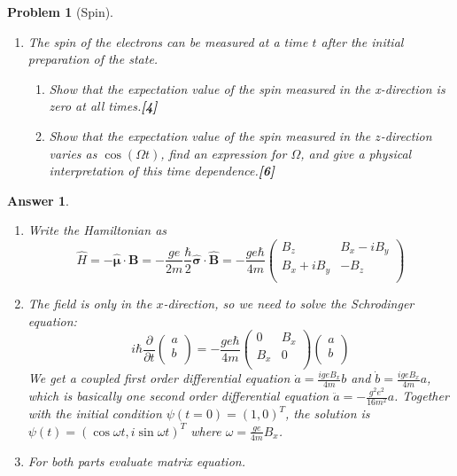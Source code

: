 \documentclass[a4paper]{article}
\newtheorem{ans}{Answer}[subsection]
\theoremstyle{new}
\newtheorem{qns}{Problem}[subsection]
\begin{document}
\begin{qns}[Spin]
\begin{enumerate}[label=(\roman*)]
\item The spin of the electrons can be measured at a time $t$ after the initial preparation of the state.
\begin{enumerate}[label=(\alph*)]
    \item Show that the expectation value of the spin measured in the x-direction is zero at all times.\hfill\textbf{[4]}
    \item  Show that the expectation value of the spin measured in the $z$-direction varies as $\cos(\Omega t)$, find an expression for $\Omega$, and give a physical interpretation of this time dependence.\hfill\textbf{[6]}
\end{enumerate}
\end{enumerate}
\end{qns}
\begin{ans}\leavevmode
\begin{enumerate}[label=(\roman*)]
\item Write the Hamiltonian as
$$\hat{H}=-\hat{\boldsymbol{\mu}}\cdot\mathbf{B}=-\frac{ge}{2m}\frac{\hbar}{2}\boldsymbol{\hat{\sigma}}\cdot\boldsymbol{\hat{B}}=-\frac{ge\hbar}{4m}
\begin{pmatrix}B_z&B_x-iB_y\\B_x+iB_y&-B_z\\\end{pmatrix}$$
\item The field is only in the $x$-direction, so we need to solve the Schrodinger equation:
$$i\hbar\frac{\partial}{\partial t}
\begin{pmatrix}a\\b\\\end{pmatrix}=-\frac{ge\hbar}{4m}\begin{pmatrix}0&B_x\\B_x&0\\\end{pmatrix}\begin{pmatrix}a\\b\\\end{pmatrix}$$
We get a coupled first order differential equation $\dot{a}=\frac{igeB_x}{4m}b$ and $\dot{b}=\frac{igeB_x}{4m}a$, which is basically one second order differential equation $\ddot{a}=-\frac{g^2e^2}{16m^2}a$. Together with the initial condition $\psi(t=0)=(1,0)^T$, the solution is $\psi(t)=(\cos\omega t,i\sin\omega t)^T$ where $\omega=\frac{ge}{4m}B_x$.
\item For both parts evaluate matrix equation.

\end{enumerate}
\end{ans}
\end{document}
